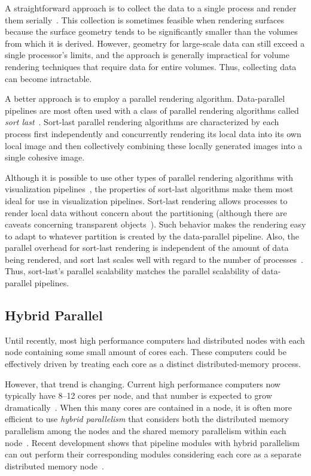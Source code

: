 \documentclass[journal,onecolumn,12pt,letterpaper,twoside]{IEEEtran}
\newcommand*{\lcite}[1]{~\cite{#1}}
\newcommand*{\keyterm}[1]{\emph{#1}}
\begin{document}
A straightforward approach is to collect the data to a single process and
render them serially\lcite{Miller1998,Johnson1999}.  This collection is
sometimes feasible when rendering surfaces because the surface geometry
tends to be significantly smaller than the volumes from which it is
derived.  However, geometry for large-scale data can still exceed a single
processor's limits, and the approach is generally impractical for volume
rendering techniques that require data for entire volumes.  Thus,
collecting data can become intractable.

A better approach is to employ a parallel rendering algorithm.
Data-parallel pipelines are most often used with a class of parallel
rendering algorithms called \keyterm{sort last}\lcite{Molnar1994}.
Sort-last parallel rendering algorithms are characterized by each process
first independently and concurrently rendering its local data into its own
local image and then collectively combining these locally generated images
into a single cohesive image.

Although it is possible to use other types of parallel rendering algorithms
with visualization pipelines\lcite{Moreland2003}, the properties of
sort-last algorithms make them most ideal for use in visualization
pipelines.  Sort-last rendering allows processes to render local data
without concern about the partitioning (although there are caveats
concerning transparent objects\lcite{Moreland2007}).  Such behavior makes
the rendering easy to adapt to whatever partition is created by the
data-parallel pipeline.  Also, the parallel overhead for sort-last
rendering is independent of the amount of data being rendered, and sort
last scales well with regard to the number of processes\lcite{Wylie2001}.
Thus, sort-last's parallel scalability matches the parallel scalability of
data-parallel pipelines.

\subsection{Hybrid Parallel}
\label{sec:HybridParallel}

Until recently, most high performance computers had distributed nodes with
each node containing some small amount of cores each.  These computers
could be effectively driven by treating each core as a distinct
distributed-memory process.

However, that trend is changing.  Current high performance computers now
typically have 8--12 cores per node, and that number is expected to grow
dramatically\lcite{ExascaleRoadMap,ASCACSummaryReport2010,ScientificDiscoveryExascale2011}.
When this many cores are contained in a node, it is often more efficient to
use \keyterm{hybrid parallelism} that considers both the distributed memory
parallelism among the nodes and the shared memory parallelism within each
node\lcite{Cappello2000}.  Recent development shows that pipeline
modules with hybrid parallelism can out perform their corresponding
modules considering each core as a separate distributed memory
node\lcite{Li2008,Camp2010,Howison2011}.
\end{document}
